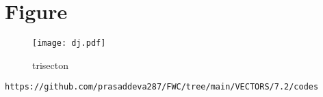 \documentclass[12pt]{article}
\begin{document}
\section{Figure}
\begin{figure}[h]
\centering
\texttt{[image: dj.pdf]}
\caption{trisecton}
		\label{fig:Figure}
\end{figure}
\begin{lstlisting}
https://github.com/prasaddeva287/FWC/tree/main/VECTORS/7.2/codes
\end{lstlisting}
\end{document}
